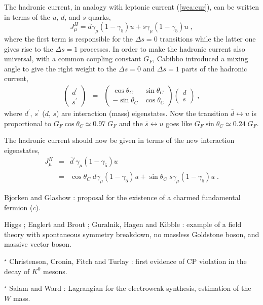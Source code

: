 \documentclass[12pt]{report}
\newcommand{\slb}[1]{\textbf{\textsl{#1}}}
\newcommand{\nin}{\noindent}
\newcommand{\gc}{\gamma_5}
\newcommand{\g}{\gamma}
\newcommand{\ba}{\begin{array}}
\newcommand{\ea}{\end{array}}
\begin{document}
The hadronic current, in analogy with leptonic current
(\ref{wea:cur}), can be written in terms of the $u$, $d$, and $s$ quarks,
\begin{equation}
J_\mu^H =  \bar{d}  \g_\mu (1 - \gc) u  +  \bar{s} \g_\mu (1 - \gc) u
\; ,
\label{had:cur:0}
\end{equation}
where the first term is responsible for the $\Delta s =0$ transitions
while the latter one gives rise to the $\Delta s =1$ processes. In order
to make the hadronic current also universal, with a common coupling
constant $G_F$, Cabibbo introduced a mixing angle to give the right
weight to the $\Delta s =0$ and $\Delta s =1$ parts of the hadronic current, 
\begin{eqnarray}
\left( \ba{c}
{ d^\prime}\\
{ s^\prime}
\ea \right) & = &
\left( \ba{cc}
\cos\theta_C & \sin\theta_C \\
-\sin\theta_C & \cos\theta_C
\ea \right) 
\left( \ba{c}
{ d} \\
{ s}
\ea \right)  \; ,
\label{cab:ang}
\end{eqnarray}
where $d^\prime$, $s^\prime$ ($d$, $s$) are interaction (mass)
eigenstates. Now the transition $\bar{d}  \leftrightarrow u$ is
proportional to $G_F \cos\theta_C \simeq 0.97 \; G_F$ and  the 
$\bar{s}  \leftrightarrow u$ goes like $G_F \sin\theta_C \simeq 0.24
\; G_F$.

The hadronic current should now be given in terms of the new
interaction eigenstates,
\begin{eqnarray}
J_\mu^H &=& \bar{d} {}^\prime  \g_\mu (1 - \gc) u 
\nonumber \\
&=& \cos\theta_C \; \bar{d} \g_\mu (1 - \gc) u  + 
    \sin\theta_C \; \bar{s} \g_\mu (1 - \gc) u \; .
\label{had:cur}
\end{eqnarray}

\nin
\fbox{\slb{1964}} Bjorken and Glashow \cite{Bjorken:64}: proposal for
the existence of a charm\-ed fundamental fermion ($c$). 

\nin
\fbox{\slb{1964}} Higgs \cite{Higgs:64}; Englert and Brout
\cite{Englert:64}; Guralnik, Hagen and Kibble \cite{Guralnik:64}:
example of a field theory with spontaneous symmetry breakdown, no
massless Goldstone boson, and massive vector boson.

\nin
\fbox{\slb{1964}} $^\star$ Christenson, Cronin, Fitch and Turlay
\cite{Christenson:64}: first evidence of CP violation in the decay of
$K^0$ mesons.

\nin
\fbox{\slb{1964}} $^\star$ Salam and Ward \cite{Salam:64}: Lagrangian
for the electroweak synthesis, estimation of the $W$ mass.
\end{document}
